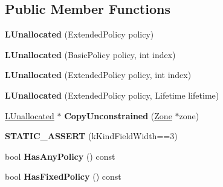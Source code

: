 \subsection*{Public Member Functions}
\begin{DoxyCompactItemize}
\item 
{\bfseries L\+Unallocated} (Extended\+Policy policy)\hypertarget{classv8_1_1internal_1_1_l_unallocated_a24f0daf9f2809e84ac9fca0359be7d76}{}\label{classv8_1_1internal_1_1_l_unallocated_a24f0daf9f2809e84ac9fca0359be7d76}

\item 
{\bfseries L\+Unallocated} (Basic\+Policy policy, int index)\hypertarget{classv8_1_1internal_1_1_l_unallocated_a410c7a1f66d1d62fbb531bde5b224421}{}\label{classv8_1_1internal_1_1_l_unallocated_a410c7a1f66d1d62fbb531bde5b224421}

\item 
{\bfseries L\+Unallocated} (Extended\+Policy policy, int index)\hypertarget{classv8_1_1internal_1_1_l_unallocated_a0903fb62f9817044371a139b0b4dd191}{}\label{classv8_1_1internal_1_1_l_unallocated_a0903fb62f9817044371a139b0b4dd191}

\item 
{\bfseries L\+Unallocated} (Extended\+Policy policy, Lifetime lifetime)\hypertarget{classv8_1_1internal_1_1_l_unallocated_a866dd337593553a2f2377455c5d51ed2}{}\label{classv8_1_1internal_1_1_l_unallocated_a866dd337593553a2f2377455c5d51ed2}

\item 
\hyperlink{classv8_1_1internal_1_1_l_unallocated}{L\+Unallocated} $\ast$ {\bfseries Copy\+Unconstrained} (\hyperlink{classv8_1_1internal_1_1_zone}{Zone} $\ast$zone)\hypertarget{classv8_1_1internal_1_1_l_unallocated_aee545f3bdf602936d36982ae7ad7a1ed}{}\label{classv8_1_1internal_1_1_l_unallocated_aee545f3bdf602936d36982ae7ad7a1ed}

\item 
{\bfseries S\+T\+A\+T\+I\+C\+\_\+\+A\+S\+S\+E\+RT} (k\+Kind\+Field\+Width==3)\hypertarget{classv8_1_1internal_1_1_l_unallocated_aca594cf6e339fcc0e76f51b6b806454c}{}\label{classv8_1_1internal_1_1_l_unallocated_aca594cf6e339fcc0e76f51b6b806454c}

\item 
bool {\bfseries Has\+Any\+Policy} () const \hypertarget{classv8_1_1internal_1_1_l_unallocated_aafcd2f07f29f9e56166d63bc880499dc}{}\label{classv8_1_1internal_1_1_l_unallocated_aafcd2f07f29f9e56166d63bc880499dc}

\item 
bool {\bfseries Has\+Fixed\+Policy} () const \hypertarget{classv8_1_1internal_1_1_l_unallocated_ac73653e1b921ffa8333dd9299a981c58}{}\label{classv8_1_1internal_1_1_l_unallocated_ac73653e1b921ffa8333dd9299a981c58}


\end{DoxyCompactItemize}
